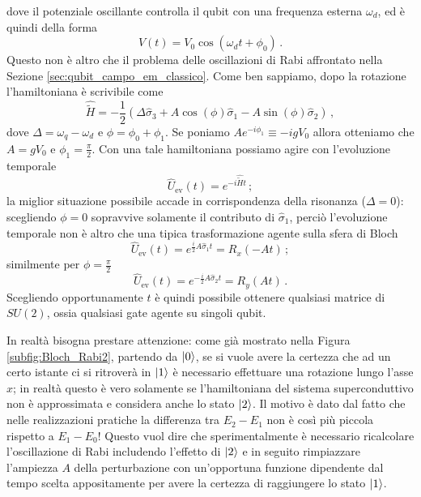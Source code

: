 dove il potenziale oscillante controlla il qubit con una frequenza esterna $\omega_d$, ed è quindi della forma
\begin{equation*}
    V(t) = V_0 \cos \! \left( \omega_d t + \phi_0 \right) \, .
\end{equation*}
Questo non è altro che il problema delle oscillazioni di Rabi affrontato nella Sezione \ref{sec:qubit_campo_em_classico}. Come ben sappiamo, dopo la rotazione l'hamiltoniana è scrivibile come
\begin{equation*}
    \hat{\tilde{H}} = -\frac{1}{2} \left( \Delta \hat{\sigma}_3 + A \cos(\phi) \hat{\sigma}_1 - A \sin (\phi) \hat{\sigma}_2 \right) \, ,
\end{equation*}
dove $\Delta = \omega_q - \omega_d$ e $\phi = \phi_0 + \phi_1$. Se poniamo $A e^{-i \phi_1} \equiv - i g V_0$ allora otteniamo che $A = g V_0$ e $\phi_1 = \frac{\pi}{2}$. Con una tale hamiltoniana possiamo agire con l'evoluzione temporale
\begin{equation*}
    \hat{U}_{\text{ev}}(t) = e^{-i \hat{\tilde{H}} t} \, ;
\end{equation*}
la miglior situazione possibile accade in corrispondenza della risonanza ($\Delta = 0$): scegliendo $\phi = 0$ sopravvive solamente il contributo di $\hat{\sigma}_1$, perciò l'evoluzione temporale non è altro che una tipica trasformazione agente sulla sfera di Bloch
\begin{equation*}
    \hat{U}_{\text{ev}}(t) = e^{\frac{i}{2} A \hat{\sigma}_1 t} = R_x(-At) \, ;
\end{equation*}
similmente per $\phi = \frac{\pi}{2}$
\begin{equation*}
    \hat{U}_{\text{ev}}(t) = e^{-\frac{i}{2} A \hat{\sigma}_2 t} = R_y(At) \, .
\end{equation*}
Scegliendo opportunamente $t$ è quindi possibile ottenere qualsiasi matrice di $SU(2)$, ossia qualsiasi gate agente su singoli qubit. 

\noindent In realtà bisogna prestare attenzione: come già mostrato nella Figura \ref{subfig:Bloch_Rabi2}, partendo da $\ket{0}$, se si vuole avere la certezza che ad un certo istante ci si ritroverà in $\ket{1}$ è necessario effettuare una rotazione lungo l'asse $x$; in realtà questo è vero solamente se l'hamiltoniana del sistema superconduttivo non è approssimata e considera anche lo stato $\ket{2}$. Il motivo è dato dal fatto che nelle realizzazioni pratiche la differenza tra $E_2 - E_1$ non è così più piccola rispetto a $E_1-E_0$! Questo vuol dire che sperimentalmente è necessario ricalcolare l'oscillazione di Rabi includendo l'effetto di $\ket{2}$ e in seguito rimpiazzare l'ampiezza $A$ della perturbazione con un'opportuna funzione dipendente dal tempo scelta appositamente per avere la certezza di raggiungere lo stato $\ket{1}$. 


